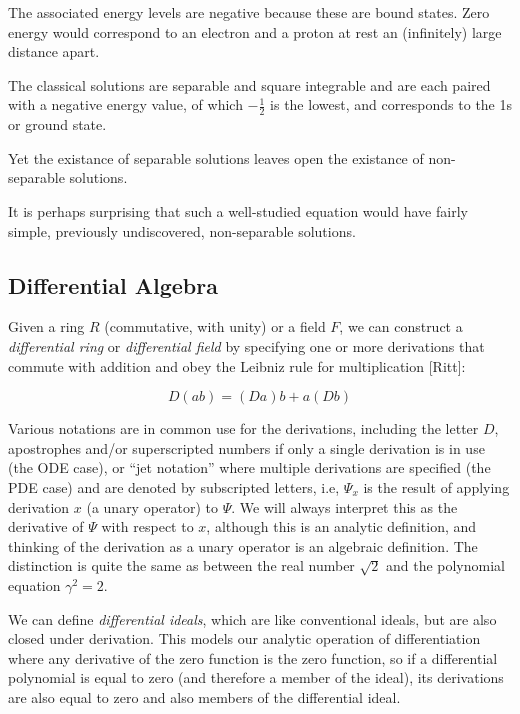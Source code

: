 \documentclass{article}
\begin{document}
The associated energy levels are negative because these are bound states.  Zero energy
would correspond to an electron and a proton at rest an (infinitely) large distance apart.

The classical solutions are separable and square integrable
and are each paired with a negative energy value, of which $-\frac{1}{2}$ is the lowest,
and corresponds to the 1s or ground state.

Yet the existance of separable solutions leaves open the existance of non-separable solutions.

It is perhaps surprising that such a well-studied equation would have fairly simple, previously
undiscovered, non-separable solutions.

\subsection*{Differential Algebra}

Given a ring $R$ (commutative, with unity) or a field $F$, we can construct a
{\it differential ring} or {\it differential field}
by specifying one or more derivations that commute
with addition and obey the Leibniz rule for multiplication [Ritt]:

\begin{equation*}
D(ab) = (Da)b + a(Db)
\end{equation*}

Various notations are in common use for the derivations, including
the letter $D$, apostrophes and/or superscripted numbers if only
a single derivation is in use (the ODE case), or ``jet notation'' where multiple derivations are specified (the PDE case)
and are denoted by subscripted letters, i.e, $\Psi_x$
is the result of applying derivation $x$ (a unary operator)
to $\Psi$.  We will always interpret this as the derivative
of $\Psi$ with respect to $x$, although this is an analytic
definition, and thinking of the derivation as a unary operator
is an algebraic definition.  The distinction is quite the same
as between the real number $\sqrt{2}$ and the polynomial
equation $\gamma^2=2$.

We can define {\it differential ideals}, which are like conventional
ideals, but are also closed under derivation.  This models
our analytic operation of differentiation where any derivative
of the zero function is the zero function, so if a differential
polynomial is equal to zero (and therefore a member of the ideal),
its derivations are also equal to zero and also members of the
differential ideal.
\end{document}
